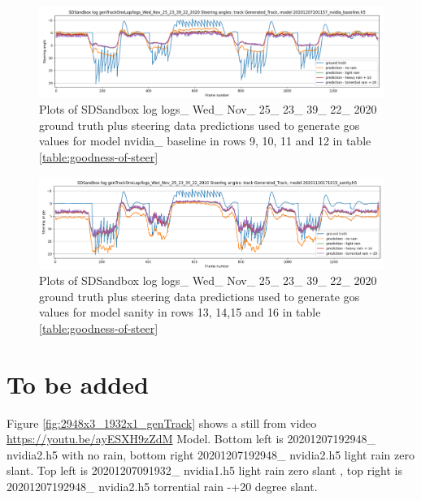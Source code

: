 \begin{figure}[ht]
 \centering 
 \includegraphics[width=\textwidth]{Figures/sa_Generated_Track_20201207201157_nvidia_baseline.h5.png}
 \caption{Plots of SDSandbox log logs\_ Wed\_ Nov\_ 25\_ 23\_ 39\_ 22\_ 2020 ground truth plus steering data predictions used to generate gos values for model nvidia\_ baseline in rows 9, 10, 11  and 12 in table \ref{table:goodness-of-steer}}
 \label{fig:sa_Generated_Track_20201207201157_nvidia_baseline.h5} 
\end{figure}

\begin{figure}[ht]
 \centering 
 \includegraphics[width=\textwidth]{Figures/sa_Generated_Track_20201120171015_sanity.h5.png}
 \caption{Plots of SDSandbox log logs\_ Wed\_ Nov\_ 25\_ 23\_ 39\_ 22\_ 2020 ground truth plus steering data predictions used to generate gos values for model sanity in rows 13, 14,15  and 16 in table \ref{table:goodness-of-steer}}
 \label{fig:sa_Generated_Track_20201120171015_sanity.h5} 
\end{figure}

\section{To be added}

Figure  \ref{fig:2948x3_1932x1_genTrack}  shows a still from video \url{https://youtu.be/ayESXH9zZdM} Model.
Bottom left is 20201207192948\_ nvidia2.h5 with no rain, bottom right 20201207192948\_ nvidia2.h5 light rain zero slant. Top left is 20201207091932\_ nvidia1.h5 light rain zero slant , top right is 20201207192948\_ nvidia2.h5 torrential rain -+20 degree slant.

